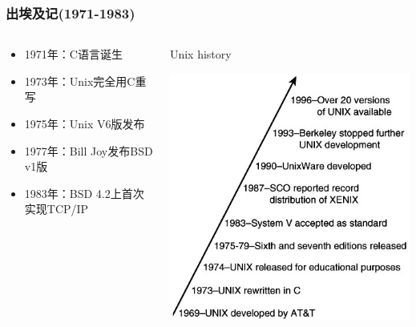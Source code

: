 \documentclass[xcolor=svgnames,presentation]{beamer}
\begin{document}
\begin{frame}
\frametitle{出埃及记(1971-1983)}
\label{sec-2-1-2}
\begin{columns}
\begin{column}{0.6\textwidth}
\label{sec-2-1-2-1}
\begin{itemize}

\item 1971年：C语言诞生
\label{sec-2-1-2-2}%

\item 1973年：Unix完全用C重写
\label{sec-2-1-2-3}%

\item 1975年：Unix V6版发布
\label{sec-2-1-2-4}%

\item 1977年：Bill Joy发布BSD v1版
\label{sec-2-1-2-5}%

\item 1983年：BSD 4.2上首次实现TCP/IP
\label{sec-2-1-2-6}%
\end{itemize} %
\end{column}
\begin{column}{0.4\textwidth}
\begin{exampleblock}{Unix history}
\label{sec-2-1-2-7}

\includegraphics[width=1\textwidth]{img/unix-history.jpg}
\end{exampleblock}
\end{column}
\end{columns}
\end{frame}
\end{document}
